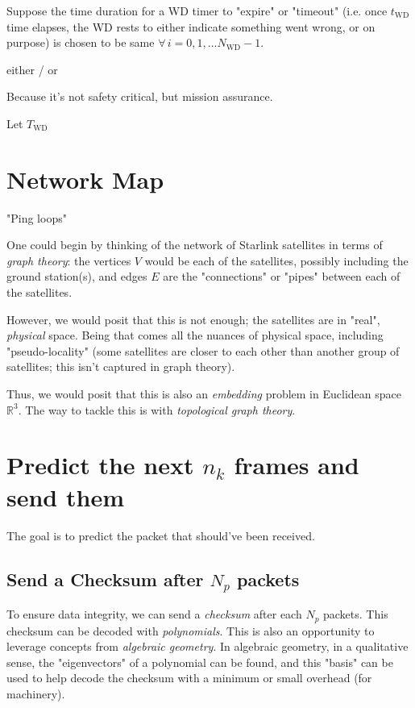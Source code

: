 \documentclass[10pt]{amsart}
\begin{document}
Suppose the time duration for a WD timer to "expire" or "timeout" (i.e. once $t_{\text{WD}}$ time elapses, the WD rests to either indicate something went wrong, or on purpose) is chosen to be same $\forall \, i = 0 ,1, \dots N_{\text{WD}} -1$.

either / or 

Because it's not safety critical, but mission assurance.

Let $T_{\text{WD}}$

\section{Network Map}

"Ping loops"

One could begin by thinking of the network of Starlink satellites in terms of \emph{graph theory}: the vertices $V$ would be each of the satellites, possibly including the ground station(s), and edges $E$ are the "connections" or "pipes" between each of the satellites.

However, we would posit that this is not enough; the satellites are in "real", \emph{physical} space. Being that comes all the nuances of physical space, including "pseudo-locality" (some satellites are closer to each other than another group of satellites; this isn't captured in graph theory). 

Thus, we would posit that this is also an \emph{embedding} problem in Euclidean space $\mathbb{R}^3$. The way to tackle this is with \emph{topological graph theory}. 

\section{Predict the next $n_k$ frames and send them}

The goal is to predict the packet that should've been received.

\subsection{Send a Checksum after $N_p$ packets}

To ensure data integrity, we can send a \emph{checksum} after each $N_p$ packets. This checksum can be decoded with \emph{polynomials}. This is also an opportunity to leverage concepts from \emph{algebraic geometry}. In algebraic geometry, in a qualitative sense, the "eigenvectors" of a polynomial can be found, and this "basis" can be used to help decode the checksum with a minimum or small overhead (for machinery).
\end{document}
